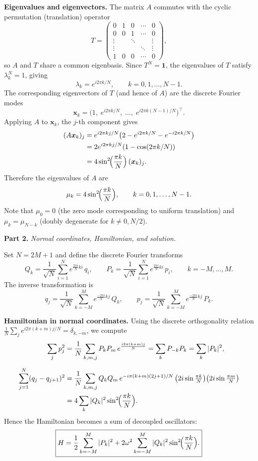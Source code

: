 \documentclass[12pt]{article}
\newcommand{\be}{\begin{equation}}
\newcommand{\ee}{\end{equation}}
\newcommand{\bea}{\begin{aligned}}
\newcommand{\eea}{\end{aligned}}
\theoremstyle{plain}
\begin{document}
\noindent\textbf{Eigenvalues and eigenvectors.}
The matrix $A$ commutes with the cyclic permutation (translation) operator
\be
  T = \begin{pmatrix}
       0 & 1 & 0 & \cdots & 0 \\
       0 & 0 & 1 & \cdots & 0 \\
       \vdots & & \ddots & & \vdots \\
       \vdots & & & \ddots & \vdots \\
       1 & 0 & 0 & \cdots & 0
      \end{pmatrix},
\ee
so $A$ and $T$ share a common eigenbasis. Since $T^N = \mathbf{1}$, the eigenvalues of $T$ satisfy $\lambda_k^N = 1$, giving
\be
  \lambda_k = e^{i2\pi k/N}, \qquad k = 0, 1, \ldots, N-1.
\ee
The corresponding eigenvectors of $T$ (and hence of $A$) are the discrete Fourier modes
\be
  \bm{x}_k = \bigl(1,\; e^{i2\pi k/N},\; \ldots,\; e^{i2\pi k(N-1)/N}\bigr)^{\!\top}.
\ee
Applying $A$ to $\bm{x}_k$, the $j$-th component gives
\be\bea
  (A\bm{x}_k)_j
    &= e^{i2\pi kj/N}\bigl(2 - e^{i2\pi k/N} - e^{-i2\pi k/N}\bigr) \\
    &= 2e^{i2\pi kj/N}(1 - \cos(2\pi k/N)) \\
    &= 4\sin^2\!\Bigl(\frac{\pi k}{N}\Bigr)\,(\bm{x}_k)_j.
\eea\ee
Therefore the eigenvalues of $A$ are
\be
  \mu_k = 4\sin^2\!\Bigl(\frac{\pi k}{N}\Bigr), \qquad k = 0, 1, \ldots, N-1.
\ee
Note that $\mu_0 = 0$ (the zero mode corresponding to uniform translation) and $\mu_k = \mu_{N-k}$
(doubly degenerate for $k \neq 0, N/2$).

\bigskip

\noindent\textbf{Part 2.} \textit{Normal coordinates, Hamiltonian, and solution.}

\medskip
\noindent Set $N = 2M+1$ and define the discrete Fourier transforms
\be
  Q_k = \frac{1}{\sqrt{N}}\sum_{i=1}^N e^{\frac{2\pi i}{N}ki}\,q_i, \qquad
  P_k = \frac{1}{\sqrt{N}}\sum_{i=1}^N e^{\frac{2\pi i}{N}ki}\,p_i,
  \qquad k = -M, \ldots, M.
\ee
The inverse transformation is
\be
  q_j = \frac{1}{\sqrt{N}}\sum_{k=-M}^M e^{\frac{-2\pi i}{N}kj}\,Q_k, \qquad
  p_j = \frac{1}{\sqrt{N}}\sum_{k=-M}^M e^{\frac{-2\pi i}{N}kj}\,P_k.
\ee

\noindent\textbf{Hamiltonian in normal coordinates.}
Using the discrete orthogonality relation $\frac{1}{N}\sum_j e^{i2\pi(k+m)j/N} = \delta_{k,-m}$, we compute
\be\bea
  \sum_j p_j^2
    &= \frac{1}{N}\sum_{k,m,j} P_k P_m\,e^{\frac{i2\pi(k+m)j}{N}}
     = \sum_k P_{-k}P_k = \sum_k |P_k|^2, \\[6pt]
  \sum_{j=1}^N(q_j - q_{j+1})^2
    &= \frac{1}{N}\sum_{k,m,j}Q_k Q_m\,
       e^{-i\pi(k+m)(2j+1)/N}\,
       \bigl(2i\sin\tfrac{\pi k}{N}\bigr)
       \bigl(2i\sin\tfrac{\pi m}{N}\bigr) \\
    &= 4\sum_k |Q_k|^2 \sin^2\!\Bigl(\frac{\pi k}{N}\Bigr).
\eea\ee
Hence the Hamiltonian becomes a sum of decoupled oscillators:
\be
  \boxed{H = \frac{1}{2}\sum_{k=-M}^M |P_k|^2
             + 2\omega^2\sum_{k=-M}^M |Q_k|^2\sin^2\!\Bigl(\frac{\pi k}{N}\Bigr).}
\ee
\end{document}
